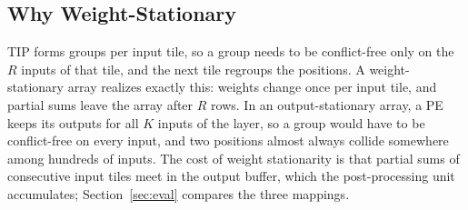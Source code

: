\subsection{Why Weight-Stationary}
\label{sec:arch-ws}
TIP forms groups per input tile, so a group needs to be conflict-free only on the $R$ inputs of that tile, and
the next tile regroups the positions. A weight-stationary array realizes exactly this: weights change once per
input tile, and partial sums leave the array after $R$ rows. In an output-stationary array, a PE keeps its outputs
for all $K$ inputs of the layer, so a group would have to be conflict-free on every input, and two positions almost
always collide somewhere among hundreds of inputs. The cost of weight stationarity is that partial sums of
consecutive input tiles meet in the output buffer, which the post-processing unit accumulates; Section~\ref{sec:eval}
compares the three mappings.
